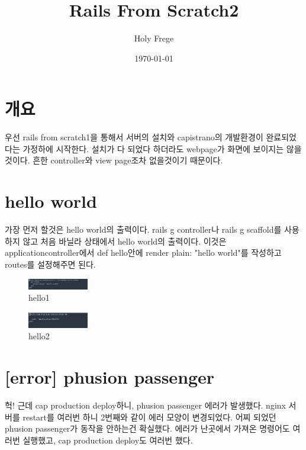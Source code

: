 \documentclass[11pt]{article}
\author{Holy Frege}
\date{\today}
\title{Rails From Scratch2}
\begin{document}
\maketitle
\tableofcontents

\section{개요}
\label{sec:org773cead}
\begin{note}
우선 rails from scratch1을 통해서 서버의 설치와 capistrano의 개발환경이 완료되었다는 가정하에 시작한다. 설치가 다 되었다 하더라도 webpage가 화면에 보이지는 않을것이다. 흔한 controller와 view page조차 없을것이기 때문이다.
\end{note}
\section{hello world}
\label{sec:orgd0f9544}
\begin{note}
가장 먼저 할것은 hello world의 출력이다. rails g controller나 rails g scaffold를 사용하지 않고 처음 바닐라 상태에서 hello world의 출력이다. 이것은 applicationcontroller에서 def hello안에 render plain: "hello world"를 작성하고 routes를 설정해주면 된다.
\end{note}
\begin{figure}[htbp]
\centering
\includegraphics[width=100px]{./img/hello1.png}
\caption{\label{fig:org93e37cc}hello1}
\end{figure}

\begin{figure}[htbp]
\centering
\includegraphics[width=100px]{./img/hello2.png}
\caption{\label{fig:org9ef9027}hello2}
\end{figure}

\section{[error] phusion passenger}
\label{sec:orga822795}
\begin{warning}
헉! 근데 cap production deploy하니, phusion passenger 에러가 발생했다. nginx 서버를 restart를 여러번 하니 2번째와 같이 에러 모양이 변경되었다. 어찌 되었던 phusion passenger가 동작을 안하는건 확실했다. 에러가 난곳에서 가져온 명령어도 여러번 실행했고, cap production deploy도 여러번 했다. 
\end{warning}
\end{document}
